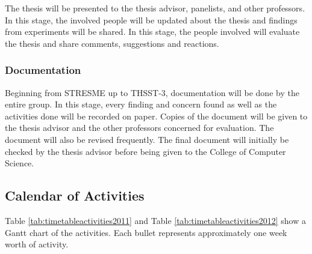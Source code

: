 The thesis will be presented to the thesis advisor, panelists, and other professors. In this stage, the involved people will be updated about the thesis and findings from experiments will be shared. In this stage, the people involved will evaluate the thesis and share comments, suggestions and reactions.

\subsubsection{Documentation}
\label{sec:documentation}

Beginning from STRESME up to THSST-3, documentation will be done by the entire group. In this stage, every finding and concern found as well as the activities done will be recorded on paper. Copies of the document will be given to the thesis advisor and the other professors concerned for evaluation. The document will also be revised frequently. The final document will initially be checked by the thesis advisor before being given to the College of Computer Science.

\subsection{Calendar of Activities}

Table \ref{tab:timetableactivities2011} and Table \ref{tab:timetableactivities2012} show a Gantt chart of the activities.  Each bullet represents approximately one week worth of activity.

%
%
\newcommand{\weekone}{\textbullet}
\newcommand{\weektwo}{\textbullet \textbullet}
\newcommand{\weekthree}{\textbullet \textbullet \textbullet}
\newcommand{\weekfour}{\textbullet \textbullet \textbullet \textbullet}

%
%
\begin{comment}
   \newcommand{\weekone}{$\star$}
   \newcommand{\weektwo}{$\star \star$}
   \newcommand{\weekthree}{$\star \star \star$}
   \newcommand{\weekfour}{$\star \star \star \star$ }
\end{comment}


